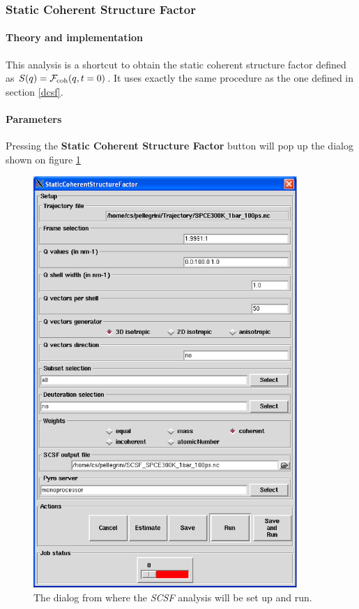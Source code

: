 \documentclass[a4paper,11pt]{report}
\begin{document}
\subsubsection{Static Coherent Structure Factor}
\label{scsf}
\paragraph{Theory and implementation\\}
\label{scsf_theory}
This analysis is a shortcut to obtain the static coherent structure factor defined as 
$S(q) = {\cal F}_{\mathrm{coh}}(q, t = 0)$. It uses exactly the same procedure as the one defined in section \ref{dcsf}.

\paragraph{Parameters\\}
\label{scsf_parameters}
Pressing the \textbf{Static Coherent Structure Factor} button will pop up the dialog shown on figure \ref{fig:scsf}
\begin{figure}[h!]
\begin{center}
\includegraphics[width=10cm]{Figures/scsf.eps}
\end{center}
\caption[The \textit{SCSF} analysis dialog]{The dialog from where the \textit{SCSF} analysis will be set up and run.}
\label{fig:scsf}
\end{figure}   
\end{document}
